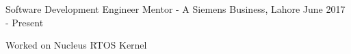 \begin{cventries}      
\cventry
	{Software Development Engineer}
	{Mentor - A Siemens Business, Lahore}
	{}
	{June 2017 - Present}
	{
		\begin{cvitems}
		    \item {Worked on Nucleus RTOS Kernel}
		\end{cvitems}
	}
	
%	

\end{cventries}
